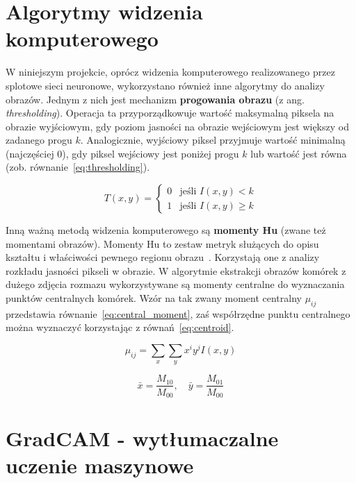 \section{Algorytmy widzenia komputerowego}

W niniejszym projekcie, oprócz widzenia komputerowego realizowanego przez splotowe sieci neuronowe, wykorzystano również inne algorytmy do analizy obrazów.
Jednym z nich jest mechanizm \textbf{progowania obrazu} (z ang. \textit{thresholding}).
Operacja ta przyporządkowuje wartość maksymalną piksela na obrazie wyjściowym, gdy poziom jasności na obrazie wejściowym jest większy od zadanego progu $k$.
Analogicznie, wyjściowy piksel przyjmuje wartość minimalną (najczęściej $0$), gdy piksel wejściowy jest poniżej progu $k$ lub wartość jest równa (zob.
równanie~\ref{eq:thresholding}).

\begin{equation}
    T(x, y) =
    \begin{cases}
        0 & \text{jeśli } I(x, y) < k \\
        1 & \text{jeśli } I(x, y) \geq k
    \end{cases}\label{eq:thresholding}
\end{equation}

Inną ważną metodą widzenia komputerowego są \textbf{momenty Hu} (zwane też momentami obrazów).
Momenty Hu to zestaw metryk służących do opisu kształtu i właściwości pewnego regionu obrazu~\cite{vision}.
Korzystają one z analizy rozkładu jasności pikseli w obrazie.
W algorytmie ekstrakcji obrazów komórek z dużego zdjęcia rozmazu wykorzystywane są momenty centralne do wyznaczania punktów centralnych komórek.
Wzór na tak zwany moment centralny $\mu_{ij}$ przedstawia równanie~\ref{eq:central_moment}, zaś współrzędne punktu centralnego można wyznaczyć korzystając z równań~\ref{eq:centroid}.

\begin{equation}
    \mu_{ij} = \sum_x \sum_y x^i y^j I(x, y)\label{eq:central_moment}
\end{equation}

\begin{equation}
    \bar{x} = \frac{M_{10}}{M_{00}}, \quad \bar{y} = \frac{M_{01}}{M_{00}}\label{eq:centroid}
\end{equation}


\section{GradCAM - wytłumaczalne uczenie maszynowe}

